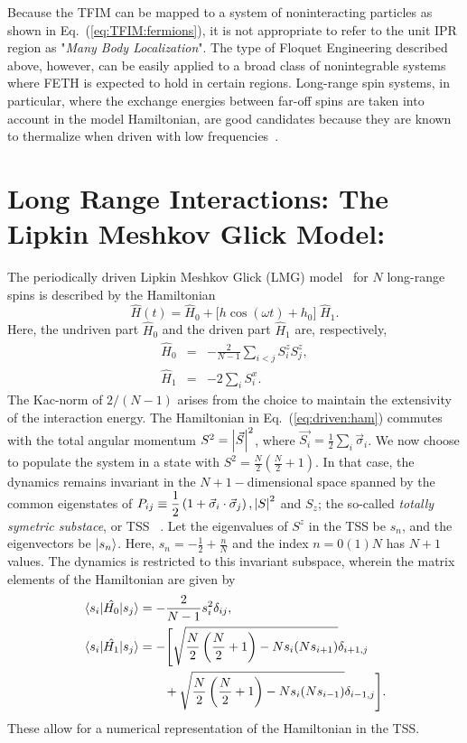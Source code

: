 \documentclass[%
reprint,
superscriptaddress,
amsmath,amssymb,
aps,
prb,
showkeys,
]{revtex4-2}
\begin{document}
Because the TFIM can be mapped to a system of noninteracting particles as shown in Eq.~(\ref{eq:TFIM:fermions}), it is not appropriate to refer to the unit IPR region as "\emph{Many Body Localization}". The type of Floquet Engineering described above, however, can be easily applied to a broad class of nonintegrable systems where FETH is expected to hold in certain regions. Long-range spin systems, in particular, where the exchange energies between far-off spins are taken into account in the model Hamiltonian, are good candidates because they are known to thermalize when driven with low frequencies~\cite{russomanno_thermalization_2015}.
\section{\label{sec:level3}Long Range Interactions: The Lipkin Meshkov Glick Model: }	
The periodically driven {Lipkin Meshkov Glick (LMG)} model~\cite{lmg1965_1,defenu2018} for $N$ long-range spins is described by the Hamiltonian
\begin{equation}
	\hat{H}(t) = \hat{H}_0 + \big[h \cos{(\omega t)} + h_0\big]\; \hat{H}_1.
	\label{eq:driven:ham}
\end{equation}
Here, the undriven part $\hat{H}_0$ and the driven part $\hat{H}_1$ are, respectively, 
	\begin{eqnarray}
		\hat{H}_0 &=& -\frac{2}{N-1} \sum_{i<j}S^z_i S^z_j,\nonumber \\
		\hat{H}_1 &=& -2 \sum_i S^x_i.
		\label{eq:h0h1}
	\end{eqnarray}
	The Kac-norm of $2/(N-1)$ arises from the choice to maintain the extensivity of the interaction energy. The Hamiltonian in Eq.~(\ref{eq:driven:ham}) commutes
with the total angular momentum $S^2 = \abs{\vec{S}}^2$, where $\vec{S_i}=\frac12 \sum_i \vec{\sigma}_i$. We now choose to populate the system in a state with $S^2=\displaystyle\frac{N}{2}\left(\frac{N}{2}+1\right)$. In that case, the dynamics remains invariant in the  $N+1-$dimensional space spanned by the common eigenstates of $P_{ij} \equiv \displaystyle\frac{1}{2}\left(1+ \vec{\sigma}_i\cdot\vec{\sigma}_j\right), \abs{S}^2$ and $S_z$; the so-called \textit{ totally symetric substace}, or TSS ~\cite{mori_prethermalization_2019}. Let the eigenvalues of $S^z$ in the TSS be $s_n$, and the eigenvectors be $\ket{s_n}$. Here, $s_n=-\frac{1}{2}+\frac{n}{N}$ and the index
$n= 0 (1) N$ has $N+1$ values. The dynamics is restricted to this invariant subspace, wherein the matrix elements of the Hamiltonian are given by
\begin{align}
	\mel{s_i}{\hat{H_0}}{s_j} &= -\frac{2}{N-1} s^2_i \delta_{ij},\nonumber\\
	\mel{s_i}{\hat{H_1}}{s_j} &= -\Bigg[\sqrt{\frac{N}{2}\left(\frac{N}{2}+1\right) - Ns_i(Ns_{i + 1})}\delta_{i+1, j} \nonumber\\ 
	&\hskip 0.7cm +\sqrt{\frac{N}{2}\left(\frac{N}{2}+1\right) - Ns_i(Ns_{i- 1})}\delta_{i-1,j}\Bigg].
	\label{eq:lmg:tssham}
\end{align}
These allow for a numerical representation of the Hamiltonian in the TSS.
\end{document}

